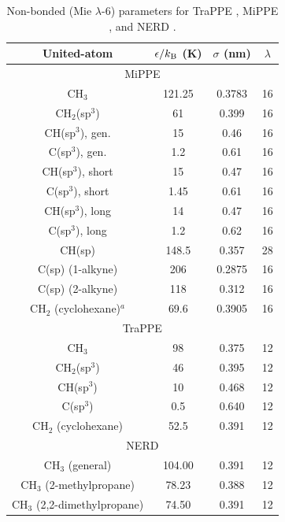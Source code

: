\documentclass[journal=jced,manuscript=article]{achemso}
\begin{document}
    \begin{table}[h!]
		\caption{Non-bonded (Mie $\lambda$-6) parameters for TraPPE \cite{TraPPE,Martin1999,Keasler2012}, MiPPE \cite{Mie,Potoff_branched,Barhaghi2017}, and NERD \cite{NERD,Nath2001}.} \label{tab:nonbonded params}
		\begin{center}
			\begin{tabular}{|c|c|c|c|}
				\hline
				United-atom & $\epsilon/k_{\rm B}$ (K) & $\sigma$ (nm) & $\lambda$ \\ \hline
				\multicolumn{4}{|c|}{MiPPE} \\ \hline
				CH$_3$ & 121.25 & 0.3783 & 16  \\ 
				CH$_2$(sp$^3$) & 61 & 0.399 & 16 \\ 
				CH(sp$^3$), gen. & 15 & 0.46 & 16\\
				C(sp$^3$), gen. & 1.2 & 0.61 & 16\\
				CH(sp$^3$), short & 15 & 0.47 & 16\\
				C(sp$^3$), short & 1.45 & 0.61 & 16\\
				CH(sp$^3$), long & 14 & 0.47 & 16\\
				C(sp$^3$), long & 1.2 & 0.62 & 16\\
				CH(sp) & 148.5 & 0.357 & 28\\
				C(sp) (1-alkyne) & 206 & 0.2875 & 16\\
				C(sp) (2-alkyne) & 118 & 0.312 & 16\\
				CH$_2$ (cyclohexane)$^a$ & 69.6 & 0.3905 & 16 \\
				\hline
                \multicolumn{4}{|c|}{TraPPE} \\ \hline
                CH$_3$ & 98 & 0.375 & 12 \\ 
                CH$_2$(sp$^3$) & 46 & 0.395 & 12\\ 
                CH(sp$^3$) & 10 & 0.468 & 12 \\
                C(sp$^3$) & 0.5 & 0.640 & 12 \\
                CH$_2$ (cyclohexane) & 52.5 & 0.391 & 12 \\
                \hline
                \multicolumn{4}{|c|}{NERD} \\ \hline
				CH$_3$ (general) & 104.00  & 0.391 & 12\\ 
				CH$_3$ (2-methylpropane) & 78.23  & 0.388 & 12\\ 
				CH$_3$ (2,2-dimethylpropane) & 74.50  & 0.391 & 12 \\  

\end{tabular}
\end{center}
\end{table}
\end{document}
